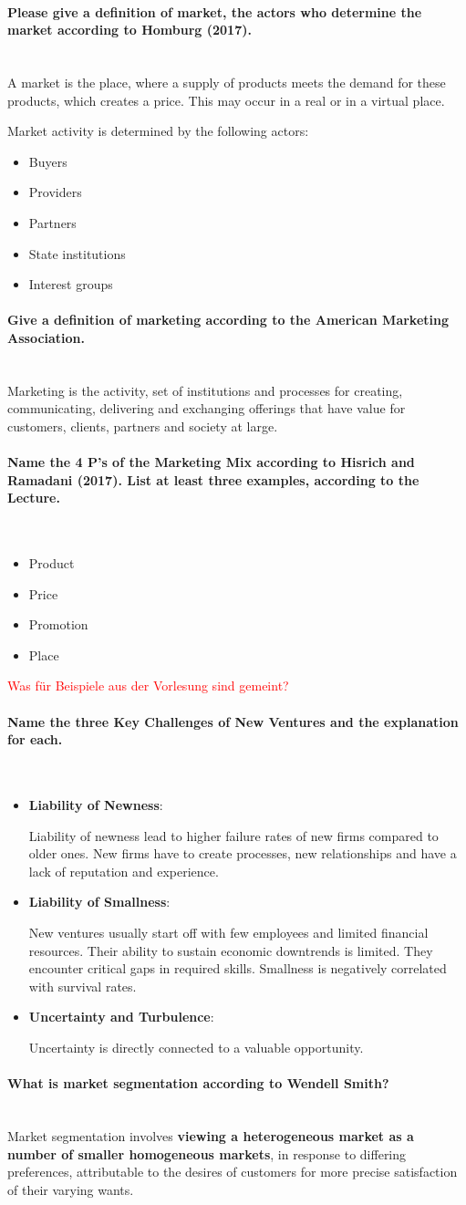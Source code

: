 \documentclass[10pt,a4paper,noendnumber=true]{scrartcl}
\newcommand{\properparagraph}[1]{\paragraph{\textcolor{Emerald}{#1}}\mbox{}\\}
\begin{document}
\properparagraph{Please give a definition of market, the actors who determine the market according to Homburg	(2017).}
A market is the place, where a supply of products meets the demand for these products, which creates a price. This may occur in a real or in a virtual place.

Market activity is determined by the following actors:
\begin{itemize}
	\item Buyers
	\item Providers
	\item Partners
	\item State institutions
	\item Interest groups
\end{itemize}

\properparagraph{Give a definition of marketing according to the American Marketing Association.}
Marketing is the activity, set of institutions and processes for creating, communicating, delivering and exchanging offerings that have value for customers, clients, partners and society at large.

\properparagraph{ Name the 4 P’s of the Marketing Mix according to Hisrich and Ramadani (2017). List at least three examples, according to the Lecture.}
\begin{itemize}
	\item Product
	\item Price
	\item Promotion
	\item Place
\end{itemize}

\textcolor{red}{Was für Beispiele aus der Vorlesung sind gemeint?}
\properparagraph{Name the three Key Challenges of New Ventures and the explanation for each.}
\begin{itemize}

	\item \textbf{Liability of Newness}: 
	
	Liability of newness lead to higher failure rates of new firms compared to older ones. New firms have to create processes, new relationships and have a lack of reputation and experience.
	
	\item \textbf{Liability of Smallness}:
	
	New ventures usually start off with few employees and limited financial resources. Their ability to sustain economic downtrends is limited. They encounter critical gaps in required skills. Smallness is negatively correlated with survival rates.
	
	\item \textbf{Uncertainty and Turbulence}:
	
	Uncertainty is directly connected to a valuable opportunity.
\end{itemize}
\properparagraph{ What is market segmentation according to Wendell Smith?}
Market segmentation involves \textbf{viewing a heterogeneous market as a number of smaller homogeneous markets}, in response to differing preferences, attributable to the desires of customers for more precise satisfaction of their varying wants.
\end{document}
